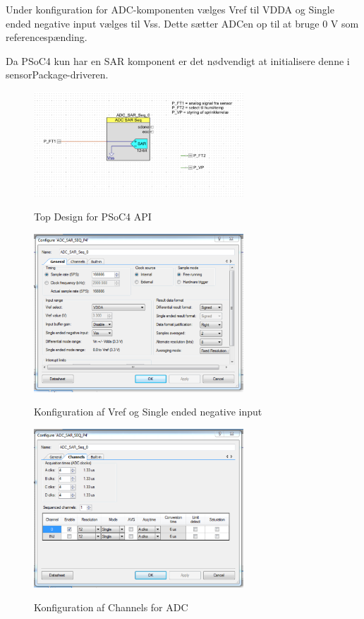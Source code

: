Under konfiguration for ADC-komponenten vælges Vref til VDDA og Single ended negative input vælges til Vss. Dette sætter ADCen op til at bruge 0 V som referencespænding.

Da PSoC4 kun har en SAR komponent er det nødvendigt at initialisere denne i sensorPackage-driveren.

\begin{figure}[htb]
\centering
{\includegraphics[width=0.70\textwidth]{filer/pics/psoc_api_topdesign}}
\caption{Top Design for PSoC4 API}
\label{lab:psoc_api_topdesign}
\end{figure}

\begin{figure}[htb]
\centering
{\includegraphics[width=0.70\textwidth]{filer/pics/psoc_api_config1}}
\caption{Konfiguration af Vref og Single ended negative input}
\label{lab:psoc_api_config1}
\end{figure}

\begin{figure}[htb]
\centering
{\includegraphics[width=0.70\textwidth]{filer/pics/psoc_api_config2}}
\caption{Konfiguration af Channels for ADC}
\label{lab:psoc_api_config2}
\end{figure}